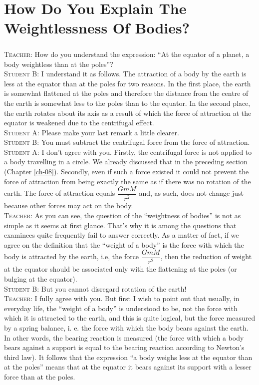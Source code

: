 \documentclass[a4paper,sfsidenotes]{tufte-book}
\begin{document}
\chapter{How Do You Explain The Weightlessness Of Bodies?}
\label{ch-09}
\paragraph{}
\textsc{Teacher:} How do you understand the expression: ``At the
equator of a planet, a body weightless than at the poles''?
\\
\textsc{Student B:} I understand it as follows. The attraction of a body by the earth is less at the
equator than at the poles for two reasons. In the first place, the earth is somewhat flattened
at the poles and therefore the distance from the centre of the earth is somewhat less to the poles than
to the equator. In the second place, the earth rotates about its axis as a result of which the force
of attraction at the equator is weakened due to the centrifugal effect.
\\
\textsc{Student A:} Please make your last remark a little clearer.
\\
\textsc{Student B:} You must subtract the centrifugal force from the force of attraction.
\\
\textsc{Student A:} I don't agree with you. Firstly, the centrifugal force is not applied to a body travelling in a circle. We already discussed that in the preceding section (Chapter \ref{ch-08}). Secondly,
even if such a force existed it could not prevent the force of attraction from being exactly the same as if there was no rotation of the earth. The force of attraction equals $\dfrac{GmM}{r^{2}}$ and, as such, does not change just because other forces may act on the body.
\\
\textsc{Teacher:} As you can see, the question of the ``weightness of bodies'' is not as simple as it seems at first glance. That's why it is among the questions that examinees quite frequently fail to answer correctly. As a matter of fact, if we agree on the definition that the ``weight of a body'' is the force with which the body is attracted by the earth, i.e, the force $\dfrac{GmM}{r^{2}}$, then the reduction of weight at the equator should be associated only with the flattening at the poles (or bulging
at the equator).
\\
\textsc{Student B:} But you cannot disregard rotation of the earth!
\\
\textsc{Teacher:} I fully agree with you. But first I wish to point out that usually, in everyday life, the ``weight of a body'' is understood to be, not the force with which it is attracted to the earth, and this is quite logical, but the force measured by a spring balance, i. e. the force with which the body bears against the earth. In other words, the bearing reaction is measured (the force with which a body bears against a support is equal to the bearing reaction according to Newton's third
law). It follows that the expression ``a body weighs less at the equator than at the poles'' means that at the equator it bears against its support with a lesser force than at the poles.
\end{document}
